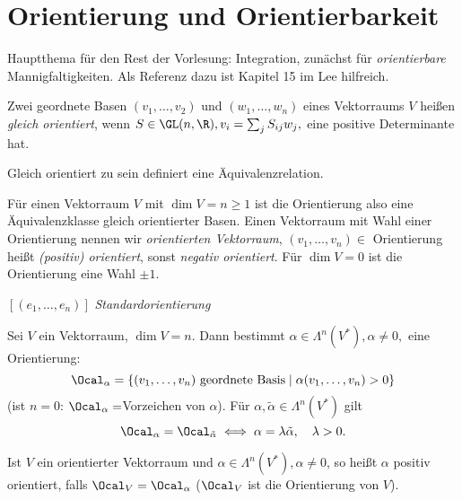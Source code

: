 \chapter{Orientierung und Orientierbarkeit}

\lecture
Hauptthema für den Rest der Vorlesung: Integration, zunächst für \emph{orientierbare} Mannigfaltigkeiten. Als Referenz dazu ist Kapitel 15 im Lee hilfreich.


\begin{defn}[Orientierung]	
	Zwei geordnete Basen \( (v_1, \dotsc, v_2) \) und \( (w_1, \dotsc, w_n) \) eines Vektorraums $V$ heißen \emph{gleich orientiert}, wenn \( S \in \GL(n,\R), v_i = \sum_j S_{ij} w_j, \) eine positive Determinante hat.
\end{defn}

\begin{rem*}
	Gleich orientiert zu sein definiert eine Äquivalenzrelation.
\end{rem*}

Für einen Vektorraum $V$ mit $\dim V = n \geq 1$ ist die Orientierung also eine Äquivalenzklasse gleich orientierter Basen. Einen Vektorraum mit Wahl einer Orientierung nennen wir \emph{orientierten Vektorraum}, \( (v_1, \dotsc, v_n) \in \) Orientierung heißt \emph{(positiv) orientiert}, sonst \emph{negativ orientiert}. Für \( \dim V = 0 \) ist die Orientierung eine Wahl $\pm1$.

\begin{exmp*}
	\( [(e_1, \dotsc, e_n)] \) \emph{Standardorientierung}
\end{exmp*}

\begin{lem}
	Sei $V$ ein Vektorraum, $\dim V = n$. Dann bestimmt \( \alpha \in \Lambda^n(V^*), \alpha \neq 0, \) eine Orientierung:
	\[ \Ocal_\alpha = \{ (v_1,\dotsc, v_n) \ \text{geordnete Basis} \mid \alpha(v_1, \dotsc, v_n) > 0 \} \]
	(ist $n = 0$: $\Ocal_\alpha = $Vorzeichen von $\alpha$). Für \( \alpha, \tilde{\alpha} \in \Lambda^n(V^*) \) gilt
	\[ \Ocal_\alpha = \Ocal_{\tilde{\alpha}} \iff \alpha = \lambda \tilde{\alpha},\quad \lambda > 0. \]
\end{lem}

\begin{rem*}
	Ist $V$ ein orientierter Vektorraum und \( \alpha \in \Lambda^n(V^*), \alpha \neq 0 \), so heißt $\alpha$ positiv orientiert, falls \( \Ocal_V = \Ocal_\alpha \) ($\Ocal_V$ ist die Orientierung von $V$).
\end{rem*}

